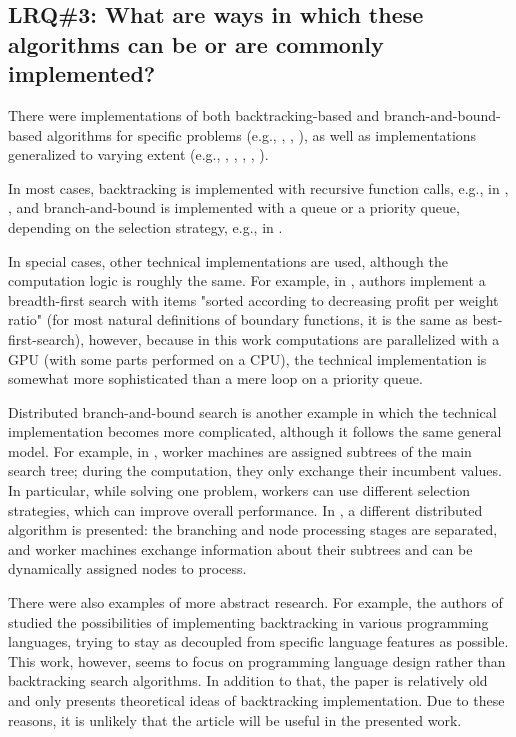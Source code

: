 \subsection{LRQ\#3: What are ways in which these algorithms can be or are commonly implemented?}

There were implementations of both backtracking-based and branch-and-bound-based algorithms
for specific problems
(e.g., \cite{bard1990bilevel}, \cite{breuel2003geometric}, \cite{lalami2012gpu}),
as well as implementations generalized to varying extent
(e.g., \cite{narkawicz2013formalnasa}, \cite{smirnov2017concur}, \cite{finkel1987distrib},
\cite{prenner1972proglangs}, \cite{johnson1988modular}).

In most cases, backtracking is implemented with recursive function calls,
e.g., in \cite{narkawicz2013formalnasa}, \cite{bard1990bilevel},
and branch-and-bound is implemented with a queue or a priority queue,
depending on the selection strategy, e.g., in \cite{breuel2003geometric}.

In special cases, other technical implementations are used, although the computation logic
is roughly the same. For example, in \cite{lalami2012gpu}, authors implement a
breadth-first search with items "sorted according to decreasing profit per weight ratio"
(for most natural definitions of boundary functions, it is the same as best-first-search),
however, because in this work computations are parallelized with a GPU
(with some parts performed on a CPU), the technical implementation is somewhat more
sophisticated than a mere loop on a priority queue.

Distributed branch-and-bound search is another example in which the technical implementation
becomes more complicated, although it follows the same general model. For example,
in \cite{smirnov2017concur}, worker machines are assigned subtrees of the main search tree;
during the computation, they only exchange their incumbent values. In particular, while solving one
problem, workers can use different selection strategies, which can improve overall performance.
In \cite{finkel1987distrib}, a different distributed algorithm is presented: the branching and
node processing stages are separated, and worker machines exchange information about their
subtrees and can be dynamically assigned nodes to process.

There were also examples of more abstract research. For example, the
authors of \cite{prenner1972proglangs} studied the possibilities of implementing
backtracking in various programming languages, trying to stay as decoupled from specific language
features as possible. This work, however, seems to focus on programming language design
rather than backtracking search algorithms. In addition to that, the paper is relatively old and
only presents theoretical ideas of backtracking implementation. Due to these reasons, it is unlikely
that the article will be useful in the presented work.

